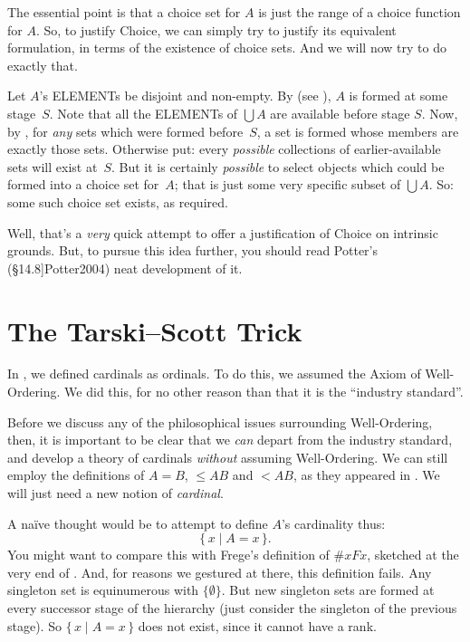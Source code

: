 \documentclass[10pt,a4paper]{article}
\makeatletter
\newcommand*{\olup}[1]{\MakeUppercase{#1}}
\theoremstyle{plain}
\theoremstyle{definition}
\theoremstyle{remark}
\newcommand*{\olfileid}[3]{}
\newcommand*{\olsection}[1]{\section*{#1}}
\newcommand{\olref}{\@ifnextchar[{\olref@i}{\olref@final}}
\def\olref@i[#1]{\@ifnextchar[{\olref@ii}{\olref@final}}
\def\olref@ii[#1]{\@ifnextchar[{\olref@iii}{\olref@final}}
\def\olref@iii[#1]{\olref@final}
\def\olref@final#1{\ref{#1}}
\providecommand{\cardle}{\leq}
\providecommand{\Setabs}[2]{\{\, #1 \mid #2 \,\}}
\providecommand{\citeyear}[1]{\cite{#1}}
\providecommand{\cardless}{<}
\providecommand{\cardeq}[2]{#1 = #2}
\makeatother
\begin{document}
The essential point is that a choice set for $A$ is just the range of
a choice function for $A$. So, to justify Choice, we can simply try to
justify its equivalent formulation, in terms of the existence of
choice sets. And we will now try to do exactly that. 

Let $A$'s \olup{element}s be disjoint and non-empty. By \stageshier{}
(see \olref[z][story]{sec}), $A$ is formed at some stage~$S$. Note
that all the \olup{element}s of $\bigcup A$ are available before stage
$S$. Now, by \stagesacc{}, for \emph{any} sets which were formed
before~$S$, a set is formed whose members are exactly those sets.
Otherwise put: every \emph{possible} collections of earlier-available
sets will exist at~$S$. But it is certainly \emph{possible} to select
objects which could be formed into a choice set for~$A$; that is just
some very specific subset of $\bigcup A$. So: some such choice set
exists, as required.

Well, that's a \emph{very} quick attempt to offer a justification of
Choice on intrinsic grounds. But, to pursue this idea further, you
should read Potter's (\citeyear[\S14.8]{Potter2004}) neat development
of it.



\olfileid{sth}{choice}{tarskiscott}
\olsection{The Tarski--Scott Trick}

In \olref[cardinals][cardsasords]{defcardinalasordinal}, we
defined cardinals as ordinals. To do this, we assumed the Axiom of
Well-Ordering. We did this, for no other reason than that it is the
``industry standard''.

Before we discuss any of the philosophical issues surrounding
Well-Ordering, then, it is important to be clear that we \emph{can}
depart from the industry standard, and develop a theory of cardinals
\emph{without} assuming Well-Ordering. We can still employ the
definitions of $\cardeq{A}{B}$, $\cardle{A}{B}$ and $\cardless{A}{B}$,
as they appeared in \olref[sfr][siz][]{chap}. We will just need a new
notion of \emph{cardinal}.

A na\"ive thought would be to attempt to define $A$'s cardinality thus:
\[
	\Setabs{x}{\cardeq{A}{x}}.
\]
You might want to compare this with Frege's definition of $\# x Fx$,
sketched at the very end of \olref[cardinals][hp]{sec}. And, for
reasons we gestured at there, this definition fails. Any singleton set
is equinumerous with $\{\emptyset\}$. But new singleton sets are
formed at every successor stage of the hierarchy (just consider the
singleton of the previous stage). So $\Setabs{x}{\cardeq{A}{x}}$ does
not exist, since it cannot have a rank.
\end{document}
